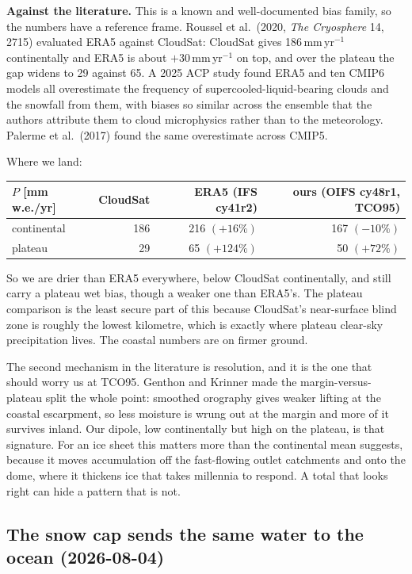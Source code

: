\documentclass[11pt,a4paper]{article}
\begin{document}
\medskip\noindent
\textbf{Against the literature.} This is a known and well-documented bias family, so the numbers
have a reference frame. Roussel et al.\ (2020, \emph{The Cryosphere} 14, 2715) evaluated ERA5
against CloudSat: CloudSat gives 186\,mm\,yr$^{-1}$ continentally and ERA5 is about
$+30$\,mm\,yr$^{-1}$ on top, and over the plateau the gap widens to 29 against 65. A 2025 ACP
study found ERA5 and ten CMIP6 models all overestimate the frequency of supercooled-liquid-bearing
clouds and the snowfall from them, with biases so similar across the ensemble that the authors
attribute them to cloud microphysics rather than to the meteorology. Palerme et al.\ (2017) found
the same overestimate across CMIP5.

Where we land:

\begin{center}
\begin{tabular}{@{}lrrr@{}}
\toprule
$P$ [mm\,w.e./yr] & CloudSat & ERA5 (IFS cy41r2) & ours (OIFS cy48r1, TCO95) \\
\midrule
continental       & 186 & 216 $(+16\%)$ & 167 $(-10\%)$ \\
plateau           &  29 &  65 $(+124\%)$ &  50 $(+72\%)$ \\
\bottomrule
\end{tabular}
\end{center}

\noindent
So we are drier than ERA5 everywhere, below CloudSat continentally, and still carry a plateau wet
bias, though a weaker one than ERA5's. The plateau comparison is the least secure part of this
because CloudSat's near-surface blind zone is roughly the lowest kilometre, which is exactly where
plateau clear-sky precipitation lives. The coastal numbers are on firmer ground.

The second mechanism in the literature is resolution, and it is the one that should worry us at
TCO95. Genthon and Krinner made the margin-versus-plateau split the whole point: smoothed
orography gives weaker lifting at the coastal escarpment, so less moisture is wrung out at the
margin and more of it survives inland. Our dipole, low continentally but high on the plateau, is
that signature. For an ice sheet this matters more than the continental mean suggests, because it
moves accumulation off the fast-flowing outlet catchments and onto the dome, where it thickens ice
that takes millennia to respond. A total that looks right can hide a pattern that is not.

\subsection{The snow cap sends the same water to the ocean (2026-08-04)}
\label{sec:calving}
\end{document}

